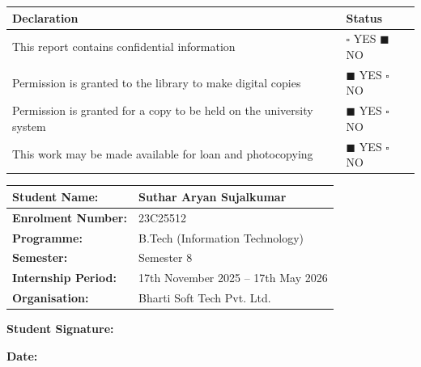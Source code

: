 \documentclass[
  12pt,
  a4paperpaper,
]{report}
\newcounter{none} %
\begin{document}
{\def\LTcaptype{none} %
\begin{longtable}[]{@{}
  >{\raggedright\arraybackslash}p{}
  >{\centering\arraybackslash}p{}@{}}
\hline
\begin{minipage}[b]{\linewidth}\raggedright
Declaration
\end{minipage} & \begin{minipage}[b]{\linewidth}\centering
Status
\end{minipage} \\
\hline
\endhead
\hline
\endlastfoot
This report contains confidential information & $\square$ YES \quad $\blacksquare$ NO \\
Permission is granted to the library to make digital copies & $\blacksquare$ YES \quad $\square$ NO \\
Permission is granted for a copy to be held on the university system & $\blacksquare$ YES \quad $\square$ NO \\
This work may be made available for loan and photocopying & $\blacksquare$ YES \quad $\square$ NO \\
\end{longtable}
}

\vspace{4pt}

\noindent\begin{tabularx}{\textwidth}{|p{5.5cm}|X|}
\hline
\textbf{Student Name:}       & Suthar Aryan Sujalkumar \\[2pt]
\hline
\textbf{Enrolment Number:}   & 23C25512 \\[2pt]
\hline
\textbf{Programme:}          & B.Tech (Information Technology) \\[2pt]
\hline
\textbf{Semester:}           & Semester 8 \\[2pt]
\hline
\textbf{Internship Period:}  & 17th November 2025 -- 17th May 2026 \\[2pt]
\hline
\textbf{Organisation:}       & Bharti Soft Tech Pvt. Ltd. \\
\hline
\end{tabularx}

\vspace{1.2cm}

\noindent
\begin{minipage}[t]{0.55\textwidth}
\textbf{Student Signature:} \underline{\hspace{2.2in}}
\end{minipage}\hfill
\begin{minipage}[t]{0.4\textwidth}
\textbf{Date:} \underline{\hspace{1.5in}}
\end{minipage}
\end{document}
